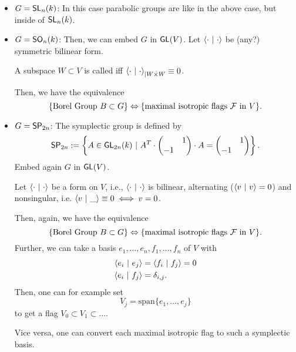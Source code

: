 \begin{example}
	\begin{itemize}
		\item $G = \textsf{SL}_n(k)$: In this case parabolic groups are like in the above case, but inside of $\textsf{SL}_n(k)$.
		\item $G = \textsf{SO}_n(k)$: Then, we can embed $G$ in $\textsf{GL}(V)$. Let $\left<\cdot ~ | ~ \cdot\right>$ be (any?) symmetric bilinear form.
		
		A subspace $W \subset V$ is called  iff $\left<\cdot ~ | ~ \cdot\right>_{|W\times W} \equiv 0$.
		
		Then, we have the equivalence
		\[ \left\lbrace \text{Borel Group } B \subset G \right\rbrace \Leftrightarrow \{ \text{maximal isotropic flags }\mathcal{F} \text{ in }V \}. \]
		\item $G = \textsf{SP}_{2n}$: The symplectic group is defined by
		\[ \textsf{SP}_{2n} := \left\lbrace A \in \textsf{GL}_{2n}(k)  ~ | ~  A^T \cdot \left(\begin{matrix}  & 1\\ - 1 &  \end{matrix}\right) \cdot A = \left(\begin{matrix}  & 1\\ - 1 &  \end{matrix}\right) \right\rbrace. \]
		Embed again $G$ in $\textsf{GL}(V)$.
		
		Let $\left<\cdot ~ | ~ \cdot\right>$ be a  form on $V$, i.e., $\left<\cdot ~ | ~ \cdot\right>$ is bilinear, alternating ($\left<v ~ | ~ v\right>= 0$) and nonsingular, i.e. $\left<v ~ | ~ \_\right> \equiv 0 \iff v = 0$.
		
		Then, again, we have the equivalence
		\[ \left\lbrace \text{Borel Group } B \subset G \right\rbrace \Leftrightarrow \{ \text{maximal isotropic flags }\mathcal{F} \text{ in }V \}. \]
		Further, we can take a basis $e_1,\ldots, e_n, f_1,\ldots, f_n$ of $V$ with
		\begin{align*}
		\left<e_i ~ | ~ e_j\right> &= \left<f_i ~ | ~ f_j\right> = 0\\
		\left<e_i ~ | ~ f_j\right> &= \delta_{i,j}.
		\end{align*}
		Then, one can for example set
		\[V_j = \mathrm{span}\{e_1,\ldots, e_j\} \]
		to get a flag $V_0 \subset V_1 \subset ...$.
		
		Vice versa, one can convert each maximal isotropic flag to such a symplectic basis.
	\end{itemize}
\end{example}